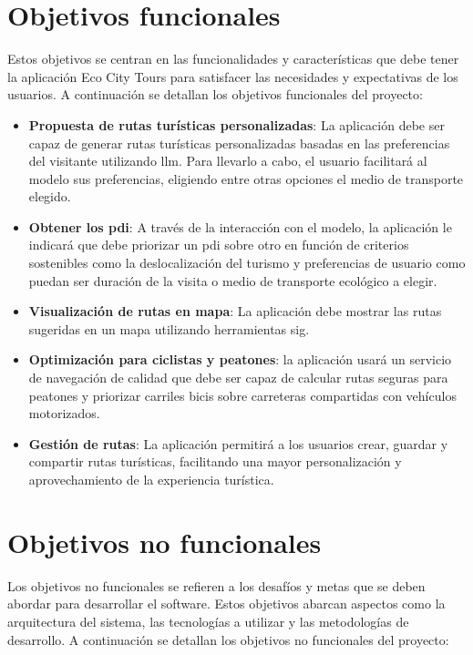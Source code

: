 
\section{Objetivos funcionales}

Estos objetivos se centran en las funcionalidades y características que debe tener la aplicación Eco City Tours para satisfacer las necesidades y expectativas de los usuarios. A continuación se detallan los objetivos funcionales del proyecto:

\begin{itemize}
    \item \textbf{Propuesta de rutas turísticas personalizadas}: La aplicación debe ser capaz de generar rutas turísticas personalizadas basadas en las preferencias del visitante utilizando \acrfull{llm}. Para llevarlo a cabo, el usuario facilitará al modelo sus preferencias, eligiendo entre otras opciones el medio de transporte elegido.
    \item \textbf{Obtener los \acrfull{pdi}}: A través de la interacción con el modelo, la aplicación le indicará que debe priorizar un \acrshort{pdi} sobre otro en función de criterios sostenibles como la deslocalización del turismo y preferencias de usuario como puedan ser duración de la visita o medio de transporte ecológico a elegir.
    \item \textbf{Visualización de rutas en mapa}: La aplicación debe mostrar las rutas sugeridas en un mapa utilizando herramientas \acrshort{sig}.
    \item \textbf{Optimización para ciclistas y peatones}: la aplicación usará un servicio de navegación de calidad que debe ser capaz de calcular rutas seguras para peatones y priorizar carriles bicis sobre carreteras compartidas con vehículos motorizados.
    \item \textbf{Gestión de rutas}: La aplicación permitirá a los usuarios crear, guardar y compartir rutas turísticas, facilitando una mayor personalización y aprovechamiento de la experiencia turística.
    

\end{itemize}

\section{Objetivos no funcionales}

Los objetivos no funcionales se refieren a los desafíos y metas que se deben abordar para desarrollar el software. Estos objetivos abarcan aspectos como la arquitectura del sistema, las tecnologías a utilizar y las metodologías de desarrollo. A continuación se detallan los objetivos no funcionales del proyecto:

